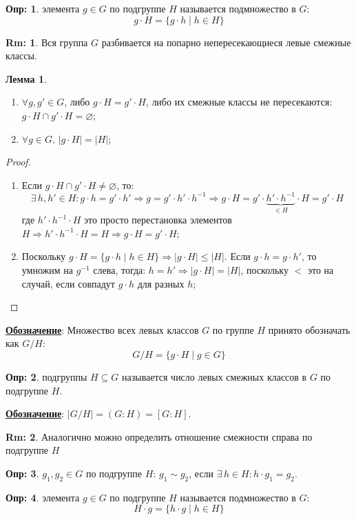 \documentclass[12pt]{article}
\newcommand{\VN}{\varnothing}
\theoremstyle{definition}
\newtheorem{defn}{Опр:}
\newtheorem{rem}{Rm:}
\newtheorem{lemma}{Лемма}
\begin{document}
\begin{defn}
	 элемента $g \in G$ по подгруппе $H$ называется подмножество в $G$: 
	$$
		g{\cdot}H = \{g{\cdot}h \mid h \in H\}
	$$
\end{defn}
\begin{rem}
	Вся группа $G$ разбивается на попарно непересекающиеся левые смежные классы.
\end{rem}
\begin{lemma}\hfill
	\begin{enumerate}[label=\arabic*)]
		\item $\forall g, g' \in G$, либо $g{\cdot}H = g'{\cdot}H$, либо их смежные классы не пересекаются: $g{\cdot}H \cap g'{\cdot}H = \VN$;
		\item $\forall g \in G, \, |g{\cdot}H| = |H|$;
	\end{enumerate}
\end{lemma}
\newpage
\begin{proof}\hfill
	\begin{enumerate}[label=\arabic*)]
		\item Если $g{\cdot}H \cap g'{\cdot}H \neq \VN$, то: 
		$$
			\exists \, h,h' \in H \colon g{\cdot}h = g'{\cdot}h' \Rightarrow g = g'{\cdot}h'{\cdot}h^{-1} \Rightarrow g{\cdot}H = g'{\cdot}\underbrace{h'{\cdot}h^{-1}}_{\in H}{\cdot}H = g'{\cdot}H
		$$
		где $h'{\cdot}h^{-1}{\cdot}H$ это просто перестановка элементов $H \Rightarrow h'{\cdot}h^{-1}{\cdot}H = H\Rightarrow g{\cdot}H = g'{\cdot}H$;
		\item Поскольку $g{\cdot}H = \{g{\cdot}h\mid h \in H\} \Rightarrow |g{\cdot}H| \leq |H|$. Если $g{\cdot}h = g{\cdot}h'$, то умножим на $g^{-1}$ слева, тогда: $h = h' \Rightarrow |g{\cdot}H| = |H|$, поскольку $<$ 
		это на случай, если совпадут $g{\cdot}h$ для разных $h$; 

	\end{enumerate}
\end{proof}

\textbf{\uline{Обозначение}}: Множество всех левых классов $G$ по группе $H$ принято обозначать как $G / H$:
$$
	G/H = \{g{\cdot}H\mid g \in G\}
$$
\begin{defn}
	 подгруппы $H \subseteq G$ называется число левых смежных классов в $G$ по подгруппе $H$.
\end{defn}
\textbf{\uline{Обозначение}}: $|G/H| = (G \colon H) = [G \colon H]$.

\begin{rem}
	Аналогично можно определить отношение смежности справа по подгруппе $H$
\end{rem}
\begin{defn}
	 $g_1,g_2 \in G$ по подгруппе $H$: $g_1 \sim g_2$, если $\exists \, h \in H \colon h{\cdot}g_1 = g_2$.
\end{defn}
\begin{defn}
	 элемента $g \in G$ по подгруппе $H$ называется подмножество в $G$: 
	$$
		H{\cdot}g = \{h{\cdot}g \mid h \in H\}
	$$
\end{defn}
\end{document}
